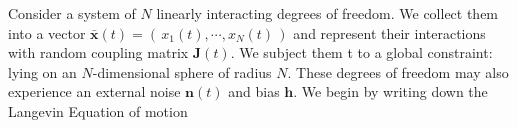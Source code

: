 Consider a system of $N$ linearly interacting degrees of freedom. We collect them into a vector $\mathbf{\bar x}(t) = \left(\,x_1(t),\cdots, x_N(t)\,\right)$ and represent their interactions with random coupling matrix $\mathbf{J}(t)$. We subject them t to a global constraint: lying on an $N$-dimensional sphere of radius $N$. These degrees of freedom may also experience an external noise $\mathbf{n}(t)$ and bias $\mathbf{h}$. We begin by writing down the Langevin Equation of motion